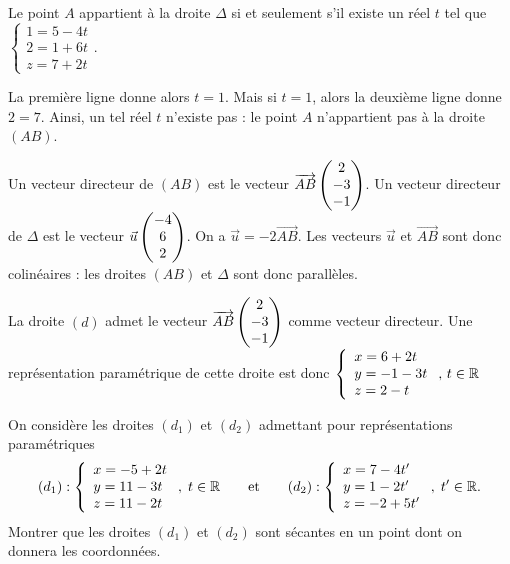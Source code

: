 \documentclass[11pt,fleqn, openany]{book} %
\begin{document}
\begin{solution}Le point \(A\) appartient à la droite \(\Delta\) si et seulement s'il existe un réel \(t\) tel que $\renewcommand{\arraystretch}{1}\left\{\begin{array}{l} 1 = 5 -4t \\ 2 = 1+6t \\ z = 7+2t \end{array}\right.$.

	La première ligne donne alors \(t=1\). Mais si \(t=1\), alors la deuxième ligne donne \(2=7\). Ainsi, un tel réel \(t\) n'existe pas : le point \(A\) n'appartient pas à la droite \((AB)\).
	
Un vecteur directeur de \((AB)\) est le vecteur \(\overrightarrow{AB}\renewcommand{\arraystretch}{1}\begin{pmatrix}2\\-3\\-1\end{pmatrix}\). Un vecteur directeur de \(\Delta\) est le vecteur \(\vec u \renewcommand{\arraystretch}{1}\begin{pmatrix}-4\\6\\2\end{pmatrix}\). On a \(\vec u = -2 \overrightarrow{AB}\). Les vecteurs \(\vec u\) et \(\overrightarrow{AB}\) sont donc colinéaires : les droites \((AB)\) et \(\Delta\) sont donc parallèles.

La droite $(d)$ admet le vecteur \(\overrightarrow{AB}\renewcommand{\arraystretch}{1}\begin{pmatrix}2\\-3\\-1\end{pmatrix}\) comme vecteur directeur. Une représentation paramétrique de cette droite est donc $\left\{\renewcommand{\arraystretch}{1}\begin{array}{l} x = 6 +2t \\ y = -1-3t \\ z = 2-t 
\end{array}\right. ,\, t\in \mathbb{R}$\end{solution}




\begin{exercise}[topic=geo04]On considère les droites $(d_1)$ et $(d_2)$ admettant pour représentations paramétriques
 \[ (d_1) : \left\{\renewcommand{\arraystretch}{1}\begin{array}{l} x = -5 +2t \\ y = 11-3t \\ z = 11-2t 

\end{array}\right. ,\; t\in \mathbb{R} \qquad \text{et}\qquad  (d_2) : \left\{\renewcommand{\arraystretch}{1}\begin{array}{l} x = 7 -4t' \\ y = 1-2t' \\ z = -2+5t' 

\end{array}\right. ,\; t'\in \mathbb{R}.\] 
Montrer que les droites $(d_1)$ et $(d_2)$ sont sécantes en un point dont on donnera les coordonnées.\end{exercise}
\end{document}
